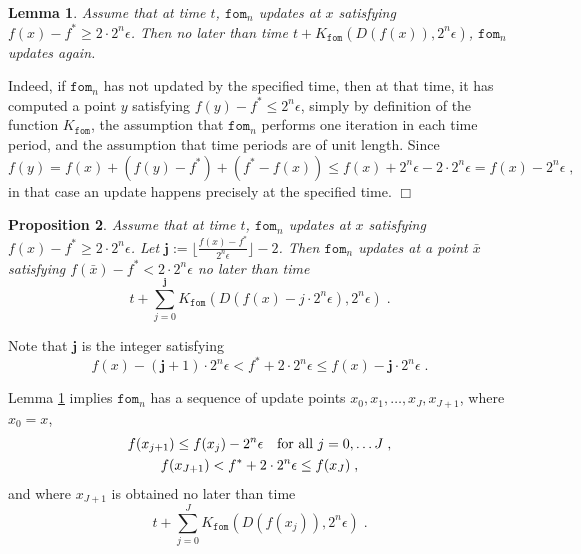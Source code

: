 \documentclass[reqno, 11pt]{amsart}
\newtheorem{prop}{Proposition}[section]
\newtheorem{lemma}[prop]{Lemma}
\numberwithin{equation}{section}
\newcommand{\fom}{\mathtt{fom}}
\begin{document}
\begin{lemma} \label{lem.fa} 
Assume that at time $ t $, $ \fom_n $ updates at $ x $ satisfying $ f(x) - f^* \geq 2 \cdot 2^n \epsilon $. Then no later than time $ t + K_{\fom}( D(f(x)), 2^n \epsilon ) $, $ \fom_n $ updates again.
\end{lemma}
  Indeed, if $ \fom_n $ has not updated by the specified time, then at that time, it has computed a point $ y $ satisfying $ f(y) - f^* \leq 2^n \epsilon $, simply by definition of the function $ K_{\fom} $, the assumption that $ \fom_n $ performs one iteration in each time period, and the assumption that time periods are of unit length. Since
\[    f(y) = f(x) + (f(y) - f^*) + (f^* - f(x)) \leq f(x) + 2^n \epsilon  - 2 \cdot 2^n \epsilon = f(x) - 2^n \epsilon  \; , \]
in that case an update happens precisely at the specified time. \hfill $ \Box $
 
\begin{prop}  \label{prop.fb}  
Assume that at time $ t $, $ \fom_n $ updates at $ x $ satisfying $ f(x) - f^* \geq 2 \cdot 2^n \epsilon $. Let $ \mathbf{j}  := \lfloor \frac{ f(x) - f^* }{ 2^n \epsilon } \rfloor - 2 $. Then $ \fom_n $ updates at a point $ \bar{x} $ satisfying $ f( \bar{x}) - f^* < 2 \cdot 2^n \epsilon $ no later than time
\begin{equation}   \label{eqn.fa} 
            t + \sum_{j=0}^{\mathbf{j}}   K_{\fom}( D( f(x) - j \cdot 2^n \epsilon), 2^n \epsilon) \; . 
\end{equation} 
\end{prop} 
 Note that $ \mathbf{j} $ is the integer satisfying
\begin{equation}  \label{eqn.fb} 
       f(x) - (\mathbf{j}+1)\cdot 2^n \epsilon < f^* + 2 \cdot 2^n \epsilon \leq    f(x) - \mathbf{j}\cdot 2^n \epsilon \; . 
\end{equation}
        
Lemma \ref{lem.fa}  implies $ \fom_n $ has a sequence of update points $ x_0, x_1, \ldots, x_J, x_{J+1} $, where $ x_0 = x $,  
\begin{gather} f(x_{j+1}) \leq f(x_j) - 2^n \epsilon \quad  \textrm{for all $ j = 0, \ldots J $} \; ,   \label{eqn.fc}  \\ f(x_{J+1}) < f^* + 2 \cdot 2^n \epsilon \leq f(x_J) \; , \label{eqn.fd} 
\end{gather}
and where $ x_{J+1} $ is obtained no later than time
\begin{equation}  \label{eqn.fe} 
      t + \sum_{j=0}^{J} K_{\fom}( D( f(x_j)), 2^n \epsilon) \; . 
 \end{equation} 
 
\end{document}
